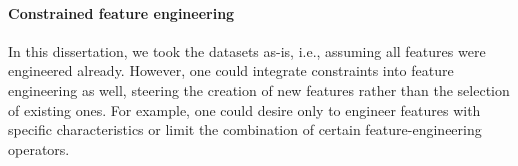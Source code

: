 \paragraph{Constrained feature engineering}

In this dissertation, we took the datasets as-is, i.e., assuming all features were engineered already.
However, one could integrate constraints into feature engineering as well, steering the creation of new features rather than the selection of existing ones.
For example, one could desire only to engineer features with specific characteristics or limit the combination of certain feature-engineering operators.
